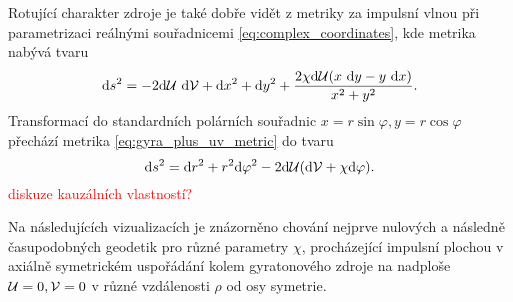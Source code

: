 Rotující charakter zdroje je také dobře vidět z metriky za impulsní vlnou při parametrizaci reálnými souřadnicemi \eqref{eq:complex_coordinates},
kde metrika nabývá tvaru
\begin{equation}
    \label{eq:gyra_plus_uv_metric}
    \mathrm{d} s^2 = -2 \mathrm{d} \mathcal{U} ~ \mathrm{d} \mathcal{V} + \mathrm{d} x^2 + \mathrm{d} y^2 + \frac{2 \chi \mathrm{d} \mathcal{U} (x~\mathrm{d} y - y~\mathrm{d} x)}{x^2 + y^2}.
\end{equation}
Transformací do standardních polárních souřadnic $x = r \sin{\varphi}, y = r \cos{\varphi}$ přechází metrika \eqref{eq:gyra_plus_uv_metric} do tvaru
\begin{equation}
    \mathrm{d} s^2 = \mathrm{d} r^2 + r^2 \mathrm{d} \varphi^2 - 2 \mathrm{d} \mathcal{U} (\mathrm{d} \mathcal{V} + \chi \mathrm{d} \varphi).
\end{equation}
\textcolor{red}{diskuze kauzálních vlastností?}

Na následujících vizualizacích je znázorněno chování nejprve nulových a následně časupodobných geodetik pro různé parametry $\chi$, procházející impulsní plochou v
axiálně symetrickém uspořádání kolem gyratonového zdroje na nadploše $\mathcal{U} = 0, \mathcal{V}=0$ v různé vzdálenosti $\rho$ od osy symetrie.

